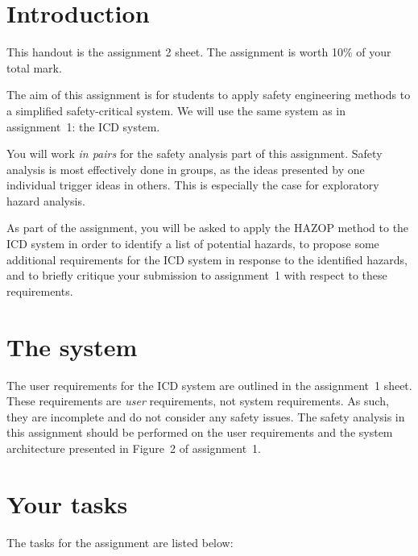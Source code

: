 \documentclass[11pt]{article}
\begin{document}

\section{Introduction}

This handout is the assignment 2 sheet. The assignment is worth 10\% of your total mark. 

The aim of this assignment is for students to apply safety engineering methods to a  simplified safety-critical system. We will use the same system as in assignment~1: the ICD system.

You will work \emph{in pairs} for the safety analysis part of this assignment. Safety analysis is most effectively done in groups, as the ideas presented by one individual trigger ideas in others. This is especially the case for exploratory hazard analysis.

As part of the assignment, you will be asked to apply the HAZOP method to the ICD system in order to identify a list of potential hazards, to propose some additional requirements for the ICD system in response to the identified hazards, and to briefly critique your submission to assignment~1 with respect to these requirements.

\section{The system}

The user requirements for the ICD system are outlined in the assignment~1 sheet. These requirements are \emph{user} requirements, not system requirements. As such, they are incomplete and do not consider any safety issues. The safety analysis in this assignment should be performed on the user requirements and the system architecture presented in Figure~2 of assignment~1.

\section{Your tasks}

The tasks for the assignment are listed below:
\end{document}

